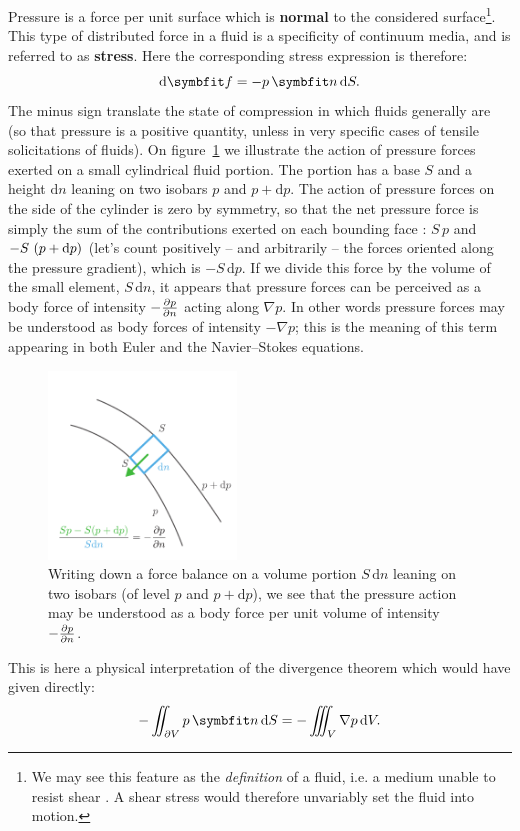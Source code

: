 \noindent Pressure is a force per unit surface which is \textbf{normal} to the considered surface\footnote{We may see this feature as the \textit{definition} of a fluid, i.e. a medium unable to resist shear \citep[][\S1.3]{Prandtl1957,Batchelor1967}. A shear stress would therefore unvariably set the fluid into motion.}. This type of distributed force in a fluid is a specificity of continuum media, and is referred to as \textbf{stress}. Here the corresponding stress expression is therefore:
\begin{equation}
\mathrm d \bff = -p \,\bn \,\dS.
\label{eq:pressure_stress}
\end{equation}
The minus sign translate the state of compression in which fluids generally are (so that pressure is a positive quantity, unless in very specific cases of tensile solicitations of fluids).
 On figure~\ref{fig:pressure_gradient} we illustrate the action of pressure forces exerted on a small cylindrical fluid portion. The portion has a base $S$ and a height $\mathrm dn$ leaning on two isobars $p$ and $p+\mathrm dp$. The action of pressure forces on the side of the cylinder is zero by symmetry, so that the net pressure force is simply the sum of the contributions exerted on each bounding face : $S\,p$ and $-S\,\left( p+\mathrm dp\right)$ (let's count positively -- and arbitrarily -- the forces oriented along the pressure gradient), which is $-S \,\mathrm dp$. If we divide this force by the volume of the small element, $S \, \mathrm dn$, it appears that pressure forces can be perceived as a body force of intensity $-\frac{\partial p}{\partial n}$ acting along $\nabla p$. In other words pressure forces may be understood as body forces of intensity $-\nabla p$; this is the meaning of this term appearing in both Euler and the Navier--Stokes equations.
\begin{figure}[htbp]
\begin{center}
\includegraphics[page=1,width=5cm]{./pics/pressure_gradient.pdf}
\caption{Writing down a force balance on a volume portion $S\,\mathrm dn$ leaning on two isobars (of level $p$ and $p + \mathrm dp$), we see that the pressure action may be understood as a body force per unit volume of intensity~$-\frac{\partial p}{\partial n}$.}
\label{fig:pressure_gradient}
\end{center}
\end{figure}
This is here a physical interpretation of the divergence theorem which would have given directly:
$$
-\iint_{\partial V} p \,\bn \, \dS = -\iiint_V \nabla p \,\dV.
$$

